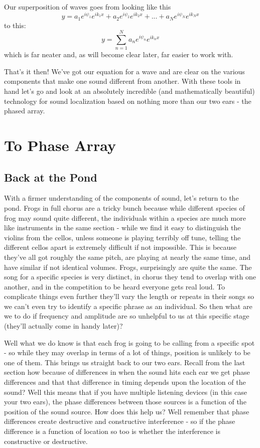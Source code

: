 \documentclass[10pt,a4paper]{article}
\begin{document}
Our superposition of waves goes from looking like this
\begin{equation}
y = a_1 e^{i\psi_1}e^{ik_1x} + a_2 e^{i\psi_2}e^{ik_2x} + ... + a_N e^{i\psi_N}e^{ik_Nx}
\end{equation}
to this:
\begin{equation}
y = \sum_{n=1}^{N}a_n e^{i\psi_n}e^{ik_nx}
\end{equation}
which is far neater and, as will become clear later, far easier to work with. 

That's it then! We've got our equation for a wave and are clear on the various components that make one sound different from another. With these tools in hand let's go and look at an absolutely incredible (and mathematically beautiful) technology for sound localization based on nothing more than our two ears - the phased array. 

\newpage
\section{To Phase Array}
\subsection{Back at the Pond}
With a firmer understanding of the components of sound, let's return to the pond.  Frogs in full chorus are a tricky bunch because while different species of frog may sound quite different, the individuals within a species are much more like instruments in the same section - while we find it easy to distinguish the violins from the cellos, unless someone is playing terribly off tune, telling the different cellos apart is extremely difficult if not impossible. This is because they've all got roughly the same pitch, are playing at nearly the same time, and have similar if not identical volumes. Frogs, surprisingly are quite the same. The song for a specific species is very distinct, in chorus they tend to overlap with one another, and in the competition to be heard everyone gets real loud. To complicate things even further they'll vary the length or repeats in their songs so we can't even try to identify a specific phrase as an individual. So then what are we to do if frequency and amplitude are so unhelpful to us at this specific stage (they'll actually come in handy later)? 

Well what we do know is that each frog is going to be calling from a specific spot - so while they may overlap in terms of a lot of things, position is unlikely to be one of them. This brings us straight back to our two ears. Recall from the last section how because of differences in when the sound hits each ear we get phase differences and that that difference in timing depends upon the location of the sound? Well this means that if you have multiple listening devices (in this case your two ears), the phase differences between those sources is a function of the position of the sound source. How does this help us? Well remember that phase differences create destructive and constructive interference - so if the phase difference is a function of location so too is whether the interference is constructive or destructive. 
\end{document}
